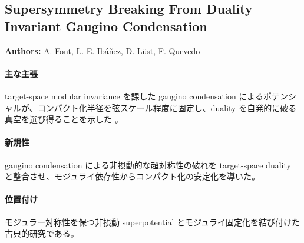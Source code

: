 \subsection{Supersymmetry Breaking From Duality Invariant Gaugino Condensation}

\textbf{Authors:} A. Font, L. E. Ib\'{a}\~{n}ez, D. L\"{u}st, F. Quevedo

\paragraph{主な主張}
target-space modular invariance を課した gaugino condensation によるポテンシャルが、コンパクト化半径を弦スケール程度に固定し、duality を自発的に破る真空を選び得ることを示した \cite{Font:1990nt}。

\paragraph{新規性}
gaugino condensation による非摂動的な超対称性の破れを target-space duality と整合させ、モジュライ依存性からコンパクト化の安定化を導いた。

\paragraph{位置付け}
モジュラー対称性を保つ非摂動 superpotential とモジュライ固定化を結び付けた古典的研究である。
